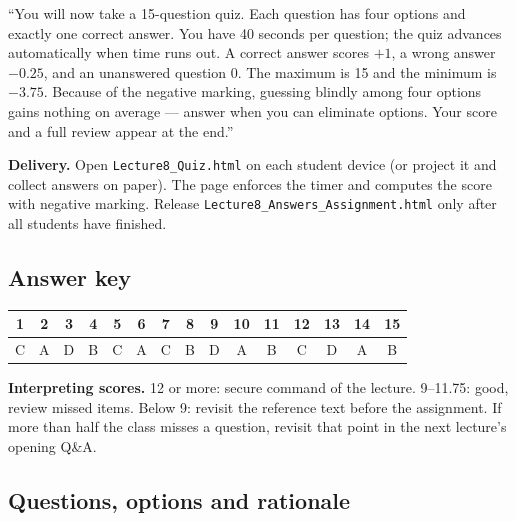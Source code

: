 \documentclass[11pt]{article}
\begin{document}
\begin{sayit}``You will now take a 15-question quiz. Each question has four options and exactly one correct answer. You have 40 seconds per question; the quiz advances automatically when time runs out. A correct answer scores $+1$, a wrong answer $-0.25$, and an unanswered question 0. The maximum is 15 and the minimum is $-3.75$. Because of the negative marking, guessing blindly among four options gains nothing on average --- answer when you can eliminate options. Your score and a full review appear at the end.''\end{sayit}

\textbf{Delivery.} Open \texttt{Lecture8\_Quiz.html} on each student device (or project it and collect answers on paper). The page enforces the timer and computes the score with negative marking. Release \texttt{Lecture8\_Answers\_Assignment.html} only after all students have finished.

\subsection*{Answer key}\begin{center}\small\renewcommand{\arraystretch}{1.3}\begin{tabular}{|c|c|c|c|c|c|c|c|c|c|c|c|c|c|c|}\hline \textbf{1} & \textbf{2} & \textbf{3} & \textbf{4} & \textbf{5} & \textbf{6} & \textbf{7} & \textbf{8} & \textbf{9} & \textbf{10} & \textbf{11} & \textbf{12} & \textbf{13} & \textbf{14} & \textbf{15}\\\hline C & A & D & B & C & A & C & B & D & A & B & C & D & A & B\\\hline\end{tabular}\end{center}

\textbf{Interpreting scores.} 12 or more: secure command of the lecture. 9--11.75: good, review missed items. Below 9: revisit the reference text before the assignment. If more than half the class misses a question, revisit that point in the next lecture's opening Q\&A.

\subsection*{Questions, options and rationale}
\end{document}
